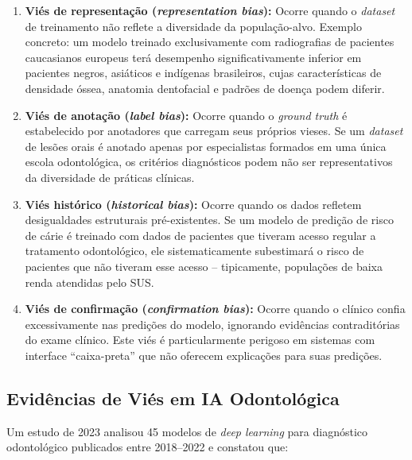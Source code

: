\begin{enumerate}
  \item \textbf{Viés de representação (\textit{representation bias}):} Ocorre
    quando o \textit{dataset} de treinamento não reflete a diversidade da
    população-alvo. Exemplo concreto: um modelo treinado exclusivamente com
    radiografias de pacientes caucasianos europeus terá desempenho
    significativamente inferior em pacientes negros, asiáticos e indígenas
    brasileiros, cujas características de densidade óssea, anatomia
    dentofacial e padrões de doença podem diferir.

  \item \textbf{Viés de anotação (\textit{label bias}):} Ocorre quando o
    \textit{ground truth} é estabelecido por anotadores que carregam seus
    próprios vieses. Se um \textit{dataset} de lesões orais é anotado apenas por
    especialistas formados em uma única escola odontológica, os critérios
    diagnósticos podem não ser representativos da diversidade de práticas
    clínicas.

  \item \textbf{Viés histórico (\textit{historical bias}):} Ocorre quando os
    dados refletem desigualdades estruturais pré-existentes. Se um modelo de
    predição de risco de cárie é treinado com dados de pacientes que tiveram
    acesso regular a tratamento odontológico, ele sistematicamente subestimará
    o risco de pacientes que não tiveram esse acesso -- tipicamente, populações
    de baixa renda atendidas pelo SUS.

  \item \textbf{Viés de confirmação (\textit{confirmation bias}):} Ocorre quando
    o clínico confia excessivamente nas predições do modelo, ignorando
    evidências contraditórias do exame clínico. Este viés é particularmente
    perigoso em sistemas com interface ``caixa-preta'' que não oferecem
    explicações para suas predições.
\end{enumerate}

\subsection{Evidências de Viés em IA Odontológica}

Um estudo de 2023 analisou 45 modelos de \textit{deep learning} para
diagnóstico odontológico publicados entre 2018--2022 e constatou que:

